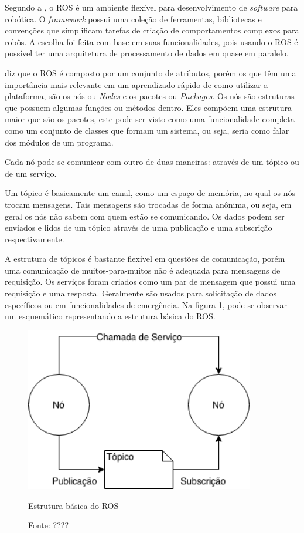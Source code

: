 Segundo a , o ROS é um ambiente flexível para desenvolvimento de \textit{software} para robótica. O \textit{framework} possui uma coleção de ferramentas, bibliotecas e convenções que simplificam tarefas de criação de comportamentos complexos para robôs. A escolha foi feita com base em suas funcionalidades, pois usando o ROS é possível ter uma arquitetura de processamento de dados em quase em paralelo.

 diz que o ROS é composto por um conjunto de atributos, porém os que têm uma importância mais relevante em um aprendizado rápido de como utilizar a plataforma, são os nós ou \textit{Nodes} e os pacotes ou \textit{Packages}. Os nós são estruturas que possuem algumas funções ou métodos dentro. %
Eles compõem uma estrutura maior que são os pacotes, este pode ser visto como uma funcionalidade completa como um conjunto de classes que formam um sistema, ou seja, seria como falar dos módulos de um programa.

Cada nó pode se comunicar com outro de duas maneiras: através de um tópico ou de um serviço.

 Um tópico é basicamente um canal, como um espaço de memória, no qual os nós trocam mensagens. Tais mensagens são trocadas de forma anônima, ou seja, em geral os nós não sabem com quem estão se comunicando. Os dados podem ser enviados e lidos de um tópico através de uma publicação e uma subscrição respectivamente.

A estrutura de tópicos é bastante flexível em questões de comunicação, porém uma comunicação de muitos-para-muitos não é adequada para mensagens de requisição. %
Os serviços foram criados como um par de mensagem que possui uma requisição e uma resposta. Geralmente são usados para solicitação de dados específicos ou em funcionalidades de emergência. Na figura \ref{Fig:ros}, pode-se observar um esquemático representando a estrutura básica do ROS.

\begin{figure}[!ht]
\centering
\includegraphics[width=10cm]{Figures/ros.png}
\caption{Estrutura básica do ROS}\label{Fig:ros}
\caption*{Fonte: ????}
\end{figure}

